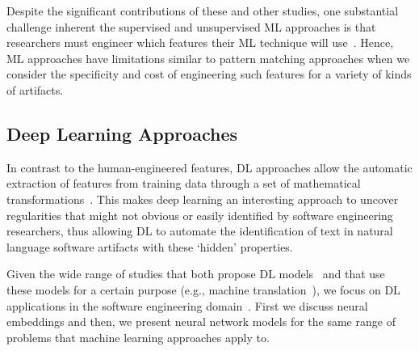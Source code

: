 
Despite the significant contributions of these and other studies,
one substantial challenge inherent the supervised and 
unsupervised \acs{ML} approaches 
is that researchers must engineer which 
features their \acs{ML} technique will use~\cite{ferreira2021}.
Hence, \acs{ML} approaches have limitations similar to pattern 
matching approaches when we consider 
the specificity and cost of engineering such features
for a variety of kinds of artifacts.








\subsection{Deep Learning Approaches}
\label{cp2:deep-learning}





In contrast to the human-engineered features,
\acf{DL} approaches allow the automatic extraction of features 
from training data through a set of mathematical transformations~\cite{Deng2018, zhang2021deep}.
This makes 
deep learning an interesting 
approach to
uncover regularities 
that might not obvious or easily identified
by software engineering researchers,
thus allowing \acs{DL}
to automate the identification of text in natural language software artifacts
with these `hidden' properties. 





Given the wide range of studies that both propose \acs{DL} models~\cite{} and that use 
these models for a certain purpose (e.g., machine translation~\cite{lopez2008translation}), 
we focus
on \acs{DL} applications in the 
software engineering domain~\cite{ferreira2021, li2018deep, watson2022}.
First we discuss neural embeddings and then, we present 
neural network models 
for the same range of problems 
that machine learning approaches apply to.






